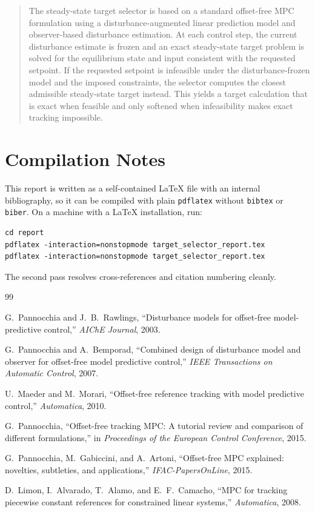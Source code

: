 \documentclass[11pt]{article}
\begin{document}
\begin{quote}
The steady-state target selector is based on a standard offset-free MPC
formulation using a disturbance-augmented linear prediction model and
observer-based disturbance estimation. At each control step, the current
disturbance estimate is frozen and an exact steady-state target problem is
solved for the equilibrium state and input consistent with the requested
setpoint. If the requested setpoint is infeasible under the disturbance-frozen
model and the imposed constraints, the selector computes the closest admissible
steady-state target instead. This yields a target calculation that is exact when
feasible and only softened when infeasibility makes exact tracking impossible.
\end{quote}

\section{Compilation Notes}
This report is written as a self-contained \LaTeX{} file with an internal
bibliography, so it can be compiled with plain \texttt{pdflatex} without
\texttt{bibtex} or \texttt{biber}. On a machine with a \LaTeX{} installation,
run:
\begin{verbatim}
cd report
pdflatex -interaction=nonstopmode target_selector_report.tex
pdflatex -interaction=nonstopmode target_selector_report.tex
\end{verbatim}
The second pass resolves cross-references and citation numbering cleanly.

\begin{thebibliography}{99}

G.~Pannocchia and J.~B.~Rawlings,
``Disturbance models for offset-free model-predictive control,''
\emph{AIChE Journal}, 2003.

G.~Pannocchia and A.~Bemporad,
``Combined design of disturbance model and observer for offset-free model predictive control,''
\emph{IEEE Transactions on Automatic Control}, 2007.

U.~Maeder and M.~Morari,
``Offset-free reference tracking with model predictive control,''
\emph{Automatica}, 2010.

G.~Pannocchia,
``Offset-free tracking MPC: A tutorial review and comparison of different formulations,''
in \emph{Proceedings of the European Control Conference}, 2015.

G.~Pannocchia, M.~Gabiccini, and A.~Artoni,
``Offset-free MPC explained: novelties, subtleties, and applications,''
\emph{IFAC-PapersOnLine}, 2015.

D.~Limon, I.~Alvarado, T.~Alamo, and E.~F.~Camacho,
``MPC for tracking piecewise constant references for constrained linear systems,''
\emph{Automatica}, 2008.

\end{thebibliography}
\end{document}
